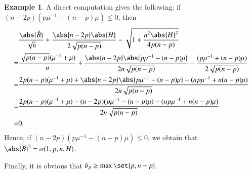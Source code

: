 \documentclass[12pt]{amsart}
\theoremstyle{plain}
\theoremstyle{remark}
\theoremstyle{definition}
\newtheorem{eg}{Example}[section]
\numberwithin{equation}{section}
\begin{document}
\begin{eg}
 A direct computation gives the following: if $(n-2p)(p\mu^{-1}-(n-p)\mu)\leq0$, then
 \begin{align*}
&\dfrac{\abs{\mathring{B}}}{\sqrt{n}}+\dfrac{\abs{n-2p}\abs{H}}{2\sqrt{p(n-p)}}-\sqrt{1+\dfrac{n^2\abs{H}^2}{4p(n-p)}}\\
=&\dfrac{\sqrt{p(n-p)}(\mu^{-1}+\mu)}{n}+\dfrac{\abs{n-2p}\abs{p\mu^{-1}-(n-p)\mu}}{2n\sqrt{p(n-p)}}-\dfrac{(p\mu^{-1}+(n-p)\mu)}{2\sqrt{p(n-p)}}\\
=&\dfrac{2p(n-p)(\mu^{-1}+\mu)+\abs{n-2p}\abs{p\mu^{-1}-(n-p)\mu}-(np\mu^{-1}+n(n-p)\mu)}{2n\sqrt{p(n-p)}}\\
=&\dfrac{2p(n-p)(\mu^{-1}+\mu)-(n-2p)(p\mu^{-1}-(n-p)\mu)-(np\mu^{-1}+n(n-p)\mu)}{2n\sqrt{p(n-p)}}\\
=&0.
\end{align*}
Hence, if $(n-2p)(p\mu^{-1}-(n-p)\mu)\leq0$, we obtain that $\abs{B}^2=\alpha(1,p,n,H)$.

Finally, it is obvious that $b_p\geq\max\set{p,n-p}$.
\end{eg}

 
\end{document}
